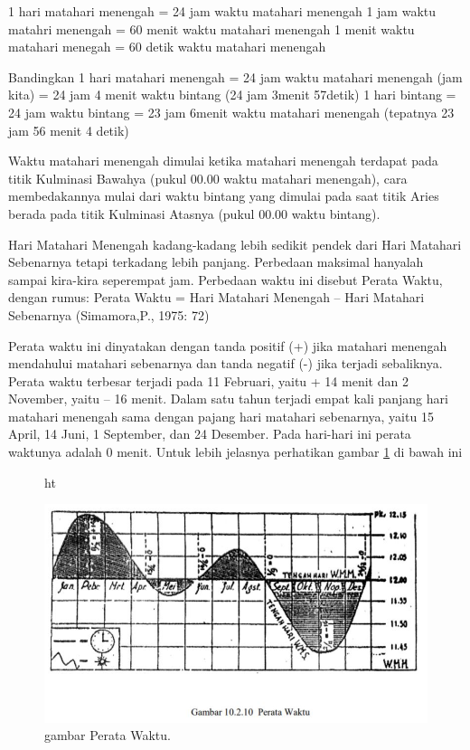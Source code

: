 	1 hari matahari menengah = 24 jam waktu matahari menengah 
	1 jam waktu matahri menengah = 60 menit waktu matahari menengah
	1 menit waktu matahari menegah = 60 detik waktu matahari menengah
	
	Bandingkan
	1 hari matahari menengah = 24 jam waktu matahari menengah (jam kita)
							 = 24 jam 4 menit waktu bintang (24 jam 3menit 57detik)
	1 hari bintang		     = 24 jam waktu bintang
							 = 23 jam 6menit waktu matahari menengah 
							  (tepatnya 23 jam 56 menit 4 detik)
								  
Waktu matahari menengah dimulai ketika matahari menengah terdapat pada titik
 Kulminasi Bawahya (pukul 00.00 waktu matahari menengah), cara membedakannya mulai 
 dari waktu bintang yang dimulai pada saat titik Aries berada
 pada titik Kulminasi Atasnya (pukul 00.00 waktu bintang).


Hari Matahari Menengah kadang-kadang lebih sedikit pendek dari Hari Matahari 
 Sebenarnya tetapi terkadang lebih panjang.   Perbedaan maksimal hanyalah 
 sampai kira-kira seperempat jam. Perbedaan waktu ini disebut Perata Waktu, 
 dengan rumus:
				Perata Waktu = Hari Matahari Menengah – Hari Matahari Sebenarnya
							(Simamora,P., 1975: 72)
								
Perata waktu ini dinyatakan dengan tanda positif (+) jika 
 matahari menengah mendahului matahari sebenarnya dan tanda negatif (-)
 jika terjadi sebaliknya. Perata waktu terbesar terjadi pada 11 Februari,
 yaitu + 14 menit dan 2 November, yaitu – 16 menit. Dalam satu tahun terjadi 
 empat kali panjang hari matahari menengah sama dengan pajang hari matahari sebenarnya,
 yaitu 15 April, 14 Juni, 1 September, dan 24 Desember. Pada hari-hari ini perata 
 waktunya adalah 0 menit.  Untuk lebih jelasnya perhatikan gambar \ref{sejarahwaktu_Capture} di bawah ini								
	
	\begin{figure}{ht}
	\centerline{\includegraphics[width=1\textwidth]{figures/sejarahwaktu_Capture.JPG}}
	\caption{gambar Perata Waktu.}
	\label{sejarahwaktu_Capture}
	\end{figure}

